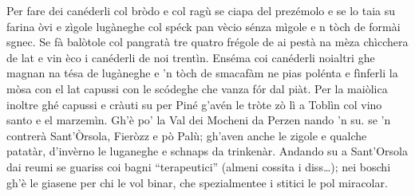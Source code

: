 \begiverse
Per fare dei canéderli
col bròdo e col ragù
se ciapa del prezémolo
e se lo taia su
farina òvi e zìgole
lugàneghe col spéck
pan vècio sénza mìgole
e n tòch de formài sgnec.
Se fà balòtole col pangratà
tre quatro frégole de ai pestà
na mèza chìcchera de lat e vin
èco i canéderli de noi trentìn.
\endverse
\beginverse
Enséma coi canéderli
noialtri ghe magnan
na tésa de lugàneghe
e 'n tòch de smacafàm
ne pias polénta e fìnferli
la mòsa con el lat
capussi con le scódeghe
che vanza fór dal piàt.
Per la maiòlica inoltre ghé
capussi e cràuti su per Piné
g'avén le tròte zò lì a Toblìn
col vino santo e el marzemìn.
\endverse
\beginverse
Gh'è po' la Val dei Mocheni
da Perzen nando 'n su.
se 'n contrerà Sant'Òrsola, 
Fieròzz e pò Palù;
gh'aven anche le zigole 
e qualche patatàr,
d'invèrno le luganeghe 
e schnaps da trinkenàr.
\endverse
\beginverse
Andando su a Sant’Orsola
dai reumi se guariss
coi bagni “terapeutici”
(almeni cossita i diss…);
nei boschi gh’è le giasene
per chi le vol binar,
che spezialmentee i stitici
le pol miracolar.
\endverse
\endsong